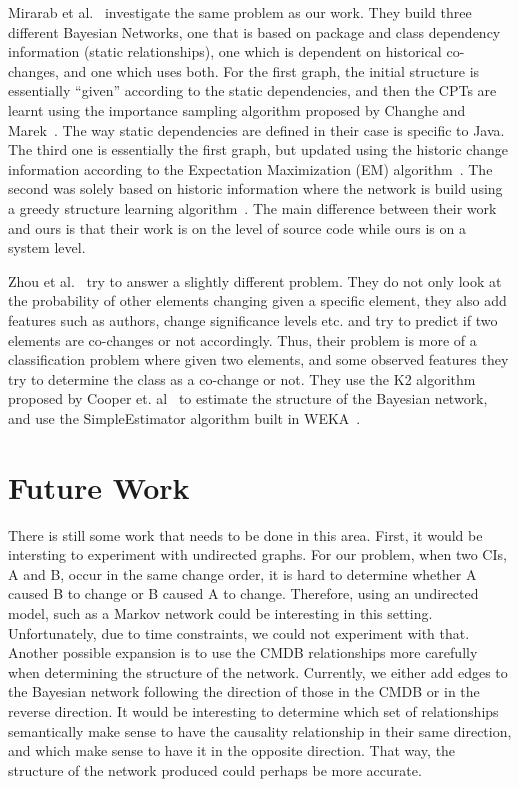 \documentclass[10pt,twocolumn,letterpaper]{article}
\begin{document}
Mirarab et al.~\cite{mirarab2007} investigate the same problem as our work. They build three
different Bayesian Networks, one that is based on package and class dependency information (static relationships), one which is dependent on historical
co-changes, and one which uses both. For the first graph, the initial structure is essentially ``given'' according to the static dependencies, and then the CPTs
are learnt using the importance sampling algorithm proposed by Changhe and Marek~\cite{yuan2003importance}. The way static dependencies are defined in their
case is specific to Java. The third one is essentially the first graph, but updated using the historic change information according to the Expectation
Maximization (EM) algorithm~\cite{dempster1977maximum}. The second was solely based on historic information where the network is build using a greedy structure
 learning algorithm~\cite{friedman1996learning}. The main difference between their work and ours is that their work is on the level of source
code while ours is on a system level.

Zhou et al.~\cite{zhou2008} try to answer a slightly different problem. They do not only look at the probability of other elements changing given a specific
element, they also add features such as authors, change significance levels etc. and try to predict if two elements are co-changes or not accordingly. Thus,
their problem is more of a classification problem where given two elements, and some observed features they try to determine the class as a co-change or not.
They use the K2 algorithm proposed by Cooper et. al~\cite{cooper1992bayesian} to estimate the structure of the Bayesian network, and use the SimpleEstimator
algorithm built in WEKA~\cite{witten2005data}.

\section{Future Work}
\label{sec:future}

There is still some work that needs to be done in this area. First, it would be intersting to experiment with undirected graphs. For our problem, when two CIs,
A and B, occur in the same change order, it is hard to determine whether A caused B to change or B caused A to change. Therefore, using an undirected model,
such as a Markov network could be interesting in this setting. Unfortunately, due to time constraints, we could not experiment with that. Another possible
expansion is to use the CMDB relationships more carefully when determining the structure of the network. Currently, we either add edges to the Bayesian network
following the direction of those in the CMDB or in the reverse direction. It would be interesting to determine which set of relationships semantically make
sense to have the causality relationship in their same direction, and which make sense to have it in the opposite direction. That way, the structure of the
network produced could perhaps be more accurate.
\end{document}
